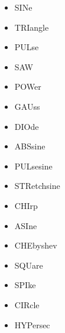    \begin{itemize}
      \item SINe
      \item TRIangle
      \item PULse
      \item SAW
      \item POWer
      \item GAUss
      \item DIOde
      \item ABSsine
      \item PULsesine
      \item STRetchsine
      \item CHIrp
      \item ASIne
      \item CHEbyshev
      \item SQUare
      \item SPIke
      \item CIRcle
      \item HYPersec
   \end{itemize}

